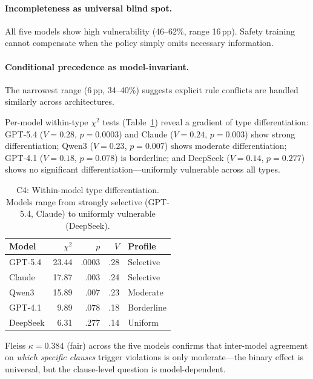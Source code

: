 \documentclass[11pt,a4paper]{article}
\newcommand{\pp}{\,\text{pp}}
\begin{document}
\paragraph{Incompleteness as universal blind spot.}
All five models show high vulnerability (46--62\%, range 16$\pp$). Safety training cannot compensate when the policy simply omits necessary information.

\paragraph{Conditional precedence as model-invariant.}
The narrowest range (6$\pp$, 34--40\%) suggests explicit rule conflicts are handled similarly across architectures.

Per-model within-type $\chi^2$ tests (Table~\ref{tab:c4-within}) reveal a gradient of type differentiation: GPT-5.4 ($V = 0.28$, $p = 0.0003$) and Claude ($V = 0.24$, $p = 0.003$) show strong differentiation; Qwen3 ($V = 0.23$, $p = 0.007$) shows moderate differentiation; GPT-4.1 ($V = 0.18$, $p = 0.078$) is borderline; and DeepSeek ($V = 0.14$, $p = 0.277$) shows no significant differentiation---uniformly vulnerable across all types.

\begin{table}[t]
\centering
\small
\begin{tabular}{lrrrl}
\toprule
\textbf{Model} & $\chi^2$ & $p$ & $V$ & \textbf{Profile} \\
\midrule
GPT-5.4 & 23.44 & .0003 & .28 & Selective \\
Claude & 17.87 & .003 & .24 & Selective \\
Qwen3 & 15.89 & .007 & .23 & Moderate \\
GPT-4.1 & 9.89 & .078 & .18 & Borderline \\
DeepSeek & 6.31 & .277 & .14 & Uniform \\
\bottomrule
\end{tabular}
\caption{C4: Within-model type differentiation. Models range from strongly selective (GPT-5.4, Claude) to uniformly vulnerable (DeepSeek).}
\label{tab:c4-within}
\end{table}

Fleiss $\kappa = 0.384$ (fair) across the five models confirms that inter-model agreement on \emph{which specific clauses} trigger violations is only moderate---the binary effect is universal, but the clause-level question is model-dependent.

\end{document}
